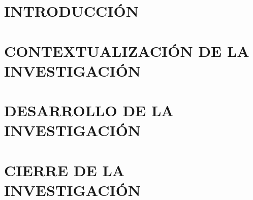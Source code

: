 \documentclass[letter,11pt,openany]{book}
\begin{document}
\frontmatter
\tableofcontents
\listoftables
\listoffigures

\mainmatter
\part*{INTRODUCCIÓN}

\part{CONTEXTUALIZACIÓN DE LA INVESTIGACIÓN}

\part{DESARROLLO DE LA INVESTIGACIÓN}












\part{CIERRE DE LA INVESTIGACIÓN}


%


\backmatter


\end{document}
